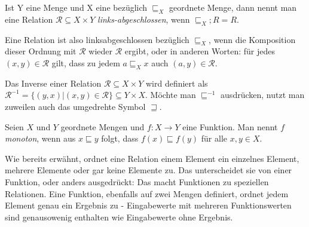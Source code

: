 \begin{mydef}
Ist Y eine Menge und X eine bezüglich $\sqsubseteq_{X}$ geordnete Menge, dann nennt man eine Relation $\mathcal{R} \subseteq X \times Y$ \textit{links-abgeschlossen}, wenn $\sqsubseteq_{X} ; R = R$.
\end{mydef}

Eine Relation ist also linksabgeschlossen bezüglich $\sqsubseteq_{X}$, wenn die Komposition dieser Ordnung mit $\mathcal{R}$
wieder $\mathcal{R}$ ergibt, oder in anderen Worten: für jedes $(x, y) \in \mathcal{R}$ gilt, dass zu jedem $a \sqsubseteq_{X} x$
auch $(a, y) \in \mathcal{R}$. 

\begin{mydef}
Das Inverse einer Relation $\mathcal{R} \subseteq X \times Y$ wird definiert als $\mathcal{R}^{-1} = \{(y, x) | (x, y) \in \mathcal{R}\}
\subseteq Y \times X$. Möchte man $\sqsubseteq^{-1}$ ausdrücken, nutzt man zuweilen auch das umgedrehte Symbol $\sqsupseteq$.
\end{mydef}

\begin{mydef}
Seien $X$ und $Y$ geordnete Mengen und $f : X \rightarrow Y$ eine Funktion. Man nennt $f$ \textit{monoton}, wenn aus $x
\sqsubseteq y$ folgt, dass $f(x) \sqsubseteq f(y)$ für alle $x, y \in X$.
\end{mydef}

%


Wie bereits erwähnt, ordnet eine Relation einem Element ein einzelnes Element, mehrere Elemente oder gar keine Elemente zu.
Das unterscheidet sie von einer Funktion, oder anders ausgedrückt: Das macht Funktionen zu speziellen Relationen. Eine
Funktion, ebenfalls auf zwei Mengen definiert, ordnet jedem Element genau ein Ergebnis zu - Eingabewerte mit
mehreren Funktionswerten sind genausowenig enthalten wie Eingabewerte ohne Ergebnis.

